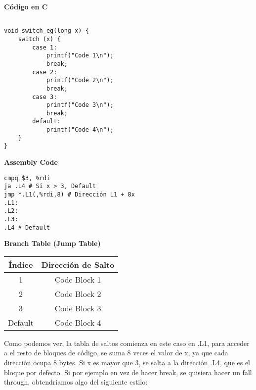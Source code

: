 \begin{center}
	\begin{minipage}{0.45\textwidth}
		\centering
		\textbf{Código en C}

		\begin{verbatim}

void switch_eg(long x) {
    switch (x) {
        case 1:
            printf("Code 1\n");
            break;
        case 2:
            printf("Code 2\n");
            break;
        case 3:
            printf("Code 3\n");
            break;
        default:
            printf("Code 4\n");
    }
}

    \end{verbatim}

	\end{minipage}
	\hfill
	\begin{minipage}{0.45\textwidth}
		\centering
		\textbf{Assembly Code}

		\begin{verbatim}
cmpq $3, %rdi
ja .L4 # Si x > 3, Default
jmp *.L1(,%rdi,8) # Dirección L1 + 8x 
.L1:
.L2:
.L3:
.L4 # Default
        \end{verbatim}

		\vspace{1em}
		\textbf{Branch Table (Jump Table)}

		\begin{tabular}{|c|c|}
			\hline
			\textbf{Índice} & \textbf{Dirección de Salto} \\
			\hline
			1               & Code Block 1                \\
			\hline
			2               & Code Block 2                \\
			\hline
			3               & Code Block 3                \\
			\hline
			Default         & Code Block 4                \\
			\hline
		\end{tabular}
	\end{minipage}
\end{center}
Como podemos ver, la tabla de saltos comienza en este caso en .L1, para acceder
a el resto de bloques de código, se suma 8 veces el valor de x, ya que cada dirección
ocupa 8 bytes. Si x es mayor que 3, se salta a la dirección .L4, que es el bloque por defecto.
Si por ejemplo en vez de hacer break, se quisiera hacer un fall through, obtendríamos algo
del siguiente estilo:
